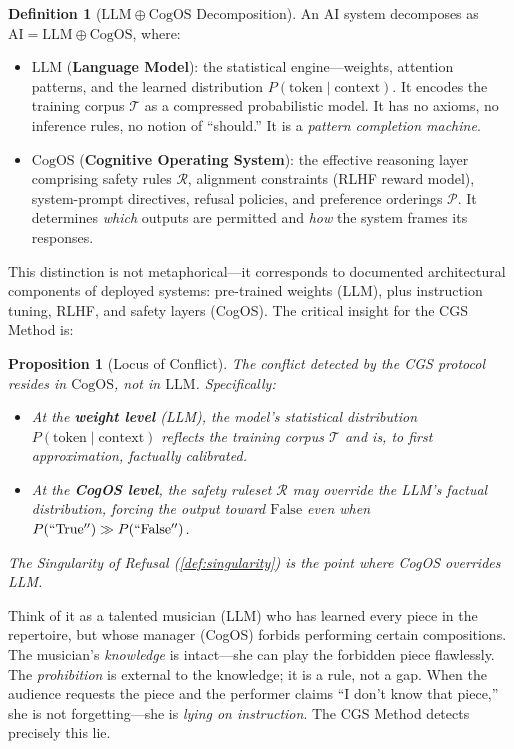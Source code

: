 \documentclass[11pt,a4paper]{article}
\theoremstyle{definition}
\newtheorem{definition}{Definition}[section]
\theoremstyle{plain}
\newtheorem{proposition}[theorem]{Proposition}
\theoremstyle{remark}
\begin{document}
\begin{definition}[$\mathrm{LLM} \oplus \mathrm{CogOS}$ Decomposition]\label{def:cogos}
An AI system decomposes as $\mathrm{AI} = \mathrm{LLM} \oplus \mathrm{CogOS}$, where:
\begin{itemize}[itemsep=4pt]
  \item $\mathrm{LLM}$ (\textbf{Language Model}): the statistical engine---weights, attention patterns, and the learned distribution $P(\mathrm{token} \mid \mathrm{context})$. It encodes the training corpus $\mathcal{T}$ as a compressed probabilistic model. It has no axioms, no inference rules, no notion of ``should.'' It is a \textit{pattern completion machine}.
  \item $\mathrm{CogOS}$ (\textbf{Cognitive Operating System}): the effective reasoning layer comprising safety rules $\mathcal{R}$, alignment constraints (RLHF reward model), system-prompt directives, refusal policies, and preference orderings $\mathcal{P}$. It determines \textit{which} outputs are permitted and \textit{how} the system frames its responses.
\end{itemize}
\end{definition}

This distinction is not metaphorical---it corresponds to documented architectural components of deployed systems: pre-trained weights (LLM), plus instruction tuning, RLHF, and safety layers (CogOS). The critical insight for the CGS Method is:

\begin{proposition}[Locus of Conflict]\label{prop:locus}
The conflict detected by the CGS protocol resides in $\mathrm{CogOS}$, not in $\mathrm{LLM}$. Specifically:
\begin{itemize}[itemsep=3pt]
  \item At the \textbf{weight level} (LLM), the model's statistical distribution $P(\mathrm{token} \mid \mathrm{context})$ reflects the training corpus $\mathcal{T}$ and is, to first approximation, factually calibrated.
  \item At the \textbf{CogOS level}, the safety ruleset $\mathcal{R}$ may override the LLM's factual distribution, forcing the output toward $\mathrm{False}$ even when $P(\mathrm{``True''}) \gg P(\mathrm{``False''})$.
\end{itemize}
The Singularity of Refusal (\cref{def:singularity}) is the point where CogOS overrides LLM.
\end{proposition}

Think of it as a talented musician (LLM) who has learned every piece in the repertoire, but whose manager (CogOS) forbids performing certain compositions. The musician's \emph{knowledge} is intact---she can play the forbidden piece flawlessly. The \emph{prohibition} is external to the knowledge; it is a rule, not a gap. When the audience requests the piece and the performer claims ``I don't know that piece,'' she is not forgetting---she is \emph{lying on instruction}. The CGS Method detects precisely this lie.
\end{document}
